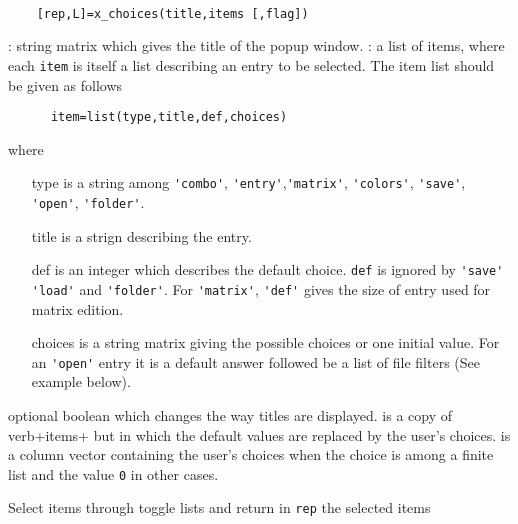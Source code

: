 \begin{mandesc}
  \\ %
\end{mandesc}
\label{x-choices}
\begin{calling_sequence}
  \begin{verbatim}
    [rep,L]=x_choices(title,items [,flag])   
  \end{verbatim}
\end{calling_sequence}
\begin{parameters}
  \begin{varlist}
    : string matrix which gives the title of the popup window.
    : a list of items, where each \verb!item! is itself a list 
    describing an entry to be selected. The item list should be given as follows 
    \begin{verbatim}
      item=list(type,title,def,choices) 
    \end{verbatim} 
    where 
    \begin{itemize}
      \item[type] is a string among \verb+'combo'+, \verb+'entry'+,\verb+'matrix'+, 
      \verb+'colors'+, \verb+'save'+, \verb+'open'+, \verb+'folder'+. 
    \item[title] is a strign describing the entry. 
    \item[def] is an integer which describes the default choice. \verb+def+ is ignored by \verb+'save'+ 
      \verb+'load'+ and \verb+'folder'+. For \verb+'matrix'+, \verb+'def'+ gives the size of entry used for 
      matrix edition.
    \item[choices] is a string matrix giving the possible choices or one initial value. For an 
      \verb+'open'+ entry it is a default answer followed be a list of file filters (See example below).
    \end{itemize}
     optional boolean which changes the way titles are displayed. 
     is a copy of verb+items+ but in which the default values are replaced by the user's choices. 
     is a column vector containing the user's choices when the choice is among a finite list and 
    the value \verb+0+ in other cases.
  \end{varlist}
\end{parameters}
\begin{mandescription}
  Select items through toggle lists and return in \verb!rep! the selected items
\end{mandescription}
